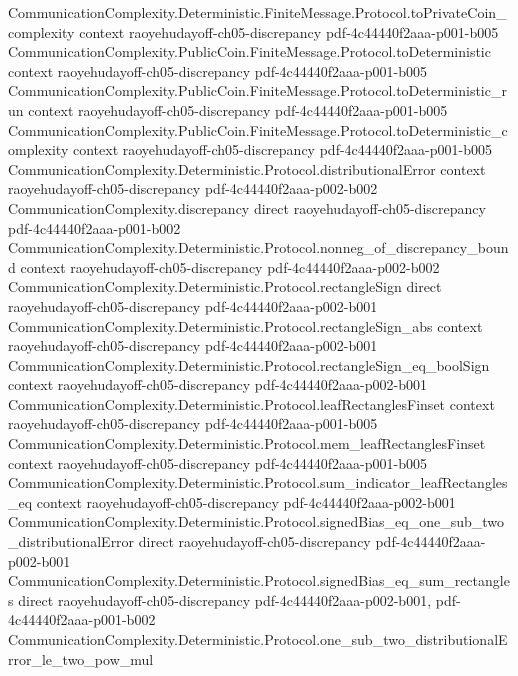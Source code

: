 \begin{theorem}
\proofstep
  {CommunicationComplexity.Deterministic.FiniteMessage.Protocol.toPrivateCoin_complexity}
  {context}
  {raoyehudayoff-ch05-discrepancy}
  {pdf-4c44440f2aaa-p001-b005}
\proofstep
  {CommunicationComplexity.PublicCoin.FiniteMessage.Protocol.toDeterministic}
  {context}
  {raoyehudayoff-ch05-discrepancy}
  {pdf-4c44440f2aaa-p001-b005}
\proofstep
  {CommunicationComplexity.PublicCoin.FiniteMessage.Protocol.toDeterministic_run}
  {context}
  {raoyehudayoff-ch05-discrepancy}
  {pdf-4c44440f2aaa-p001-b005}
\proofstep
  {CommunicationComplexity.PublicCoin.FiniteMessage.Protocol.toDeterministic_complexity}
  {context}
  {raoyehudayoff-ch05-discrepancy}
  {pdf-4c44440f2aaa-p001-b005}
\proofstep
  {CommunicationComplexity.Deterministic.Protocol.distributionalError}
  {context}
  {raoyehudayoff-ch05-discrepancy}
  {pdf-4c44440f2aaa-p002-b002}
\proofstep
  {CommunicationComplexity.discrepancy}
  {direct}
  {raoyehudayoff-ch05-discrepancy}
  {pdf-4c44440f2aaa-p001-b002}
\proofstep
  {CommunicationComplexity.Deterministic.Protocol.nonneg_of_discrepancy_bound}
  {context}
  {raoyehudayoff-ch05-discrepancy}
  {pdf-4c44440f2aaa-p002-b002}
\proofstep
  {CommunicationComplexity.Deterministic.Protocol.rectangleSign}
  {direct}
  {raoyehudayoff-ch05-discrepancy}
  {pdf-4c44440f2aaa-p002-b001}
\proofstep
  {CommunicationComplexity.Deterministic.Protocol.rectangleSign_abs}
  {context}
  {raoyehudayoff-ch05-discrepancy}
  {pdf-4c44440f2aaa-p002-b001}
\proofstep
  {CommunicationComplexity.Deterministic.Protocol.rectangleSign_eq_boolSign}
  {context}
  {raoyehudayoff-ch05-discrepancy}
  {pdf-4c44440f2aaa-p002-b001}
\proofstep
  {CommunicationComplexity.Deterministic.Protocol.leafRectanglesFinset}
  {context}
  {raoyehudayoff-ch05-discrepancy}
  {pdf-4c44440f2aaa-p001-b005}
\proofstep
  {CommunicationComplexity.Deterministic.Protocol.mem_leafRectanglesFinset}
  {context}
  {raoyehudayoff-ch05-discrepancy}
  {pdf-4c44440f2aaa-p001-b005}
\proofstep
  {CommunicationComplexity.Deterministic.Protocol.sum_indicator_leafRectangles_eq}
  {context}
  {raoyehudayoff-ch05-discrepancy}
  {pdf-4c44440f2aaa-p002-b001}
\proofstep
  {CommunicationComplexity.Deterministic.Protocol.signedBias_eq_one_sub_two_distributionalError}
  {direct}
  {raoyehudayoff-ch05-discrepancy}
  {pdf-4c44440f2aaa-p002-b001}
\proofstep
  {CommunicationComplexity.Deterministic.Protocol.signedBias_eq_sum_rectangles}
  {direct}
  {raoyehudayoff-ch05-discrepancy}
  {pdf-4c44440f2aaa-p002-b001,
    pdf-4c44440f2aaa-p001-b002}
\proofstep
  {CommunicationComplexity.Deterministic.Protocol.one_sub_two_distributionalError_le_two_pow_mul}

\end{theorem}
